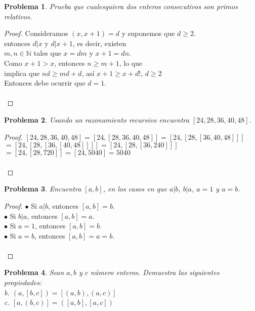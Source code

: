 \documentclass[12pt,oneside]{article}
\newtheorem{prob}{Problema}
\begin{document}
\begin{prob} %
Prueba que cualesquiera dos enteros consecutivos son primos relativos.
\end{prob}

\begin{proof}
Consideramos $(x, x+1) = d$ y suponemos que $d \geq 2$.\\
entonces $d|x$ y $d|x+1$, es decir, existen\\
$m,n \in \mathbb{N}$ tales que $x=dm$ y $x+1 = dn$.\\
Como $x+1 > x$, entonces $n \geq m+1$, lo que\\
implica que $nd \geq md + d$, as\'i $x+1 \geq x+d!$, $d \geq 2$\\
Entonces debe ocurrir que $d=1$.\\\\
\end{proof}

\begin{prob} %
Usando un razonamiento recursivo encuentra $[24, 28, 36, 40, 48]$.
\end{prob}

\begin{proof}
$[24,28,36,40,48] = [24,[28,36,40,48]] = [24,[28,[36,40,48]]]$\\
$= [24,[28,[36,[40,48]]]] = [24,[28,[36,240]]]$
$= [24,[28,720]] = [24,5040] = 5040$\\\\ 
\end{proof}

\begin{prob} %
Encuentra $[a,b]$, en los casos en que $a|b$, $b|a$, $a=1$ y $a=b$.
\end{prob}

\begin{proof}
$\bullet$ Si $a|b$, entonces $[a,b] = b$.\\
$\bullet$ Si $b|a$, entonces $[a,b] = a$.\\
$\bullet$ Si $a=1$, entonces $[a,b] = b$.\\
$\bullet$ Si $a=b$, entonces $[a,b] = a = b$.\\\\
\end{proof}


\begin{prob} %
Sean $a,b$ y $c$ n\'umero enteros. Demuestra las siguientes propiedades:\\
b. $(a,[b,c]) = [(a,b),(a,c)]$\\ 
c. $[a,(b,c)] = ([a,b],[a,c])$
\end{prob}
\end{document}
